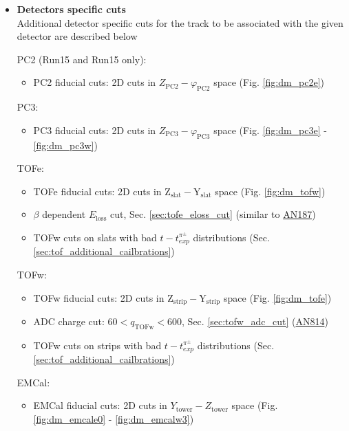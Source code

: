 \begin{description}
\begin{itemize}
            \item \textbf{Detectors specific cuts} \\					
					Additional detector specific cuts for the track to be associated with the given detector are described below

               PC2 (Run15 \pAl and Run15 \pAu only):
					\begin{itemize}
                  \item PC2 fiducial cuts: 2D cuts in $Z_{\text{PC2}} - \varphi_{\text{PC2}}$ space (Fig. \ref{fig:dm_pc2e})
					\end{itemize}

					PC3:
					\begin{itemize}
                  \item PC3 fiducial cuts: 2D cuts in $Z_{\text{PC3}} - \varphi_{\text{PC3}}$ space (Fig. \ref{fig:dm_pc3e} - \ref{fig:dm_pc3w})
					\end{itemize}
					
					TOFe:
					\begin{itemize}
                  \item TOFe fiducial cuts: 2D cuts in $\text{Z}_{\text{slat}} - \text{Y}_{\text{slat}}$ space (Fig. \ref{fig:dm_tofw})
                  \item $\beta$ dependent $E_{\text{loss}}$ cut, Sec. \ref{sec:tofe_eloss_cut} (similar to \href{https://phenix-intra.sdcc.bnl.gov/phenix/WWW/p/draft/chujo/PPG026/AnalysisNote/}{AN187})
                  \item TOFw cuts on slats with bad $t - t_{exp}^{\pi^\pm}$ distributions (Sec. \ref{sec:tof_additional_cailbrations})
					\end{itemize}

					TOFw:
					\begin{itemize}
                  \item TOFw fiducial cuts: 2D cuts in $\text{Z}_{\text{strip}} - \text{Y}_{\text{strip}}$ space (Fig. \ref{fig:dm_tofe})
                  \item ADC charge cut: $60 < q_{\text{TOFw}} < 600$, Sec. \ref{sec:tofw_adc_cut} (\href{https://phenix-intra.sdcc.bnl.gov/phenix/WWW/p/draft/belmonrj/AnalysisNotes/ananoterun7.pdf}{AN814})
                  \item TOFw cuts on strips with bad $t - t_{exp}^{\pi^\pm}$ distributions (Sec. \ref{sec:tof_additional_cailbrations})
					\end{itemize}

					EMCal:
					\begin{itemize}
                  \item EMCal fiducial cuts: 2D cuts in $Y_{\text{tower}} - Z_{\text{tower}}$ space (Fig. \ref{fig:dm_emcale0} - \ref{fig:dm_emcalw3})
					\end{itemize}


\end{itemize}
\end{description}
